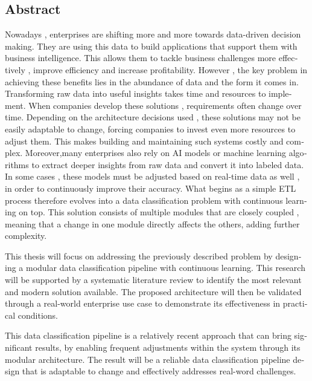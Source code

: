 

\begin{otherlanguage}{american}
	\chapter*{Abstract}
	Nowadays , enterprises are shifting more and more towards data-driven decision making. They are using this data to build applications that support them with business intelligence. This allows them to tackle business challenges more effectively , improve efficiency and increase profitability. However , the key problem in achieving these benefits lies in the abundance of data and the form it comes in. Transforming raw data into useful insights takes time and resources to implement. When companies develop these solutions , requirements often change over time. Depending on the architecture decisions used , these solutions may not be easily adaptable to change, forcing companies to invest even more resources to adjust them. This makes building and maintaining such systems costly and complex. Moreover,many enterprises also rely on AI models or machine learning algorithms to extract deeper insights from raw data and convert it into labeled data. In some cases , these models must be adjusted based on real-time data as well , in order to continuously improve their accuracy. What begins as a simple ETL process therefore evolves into a data classification problem with continuous learning on top. This solution consists of multiple modules that are closely coupled , meaning that a change in one module directly affects the others, adding further complexity.
	\smallskip

	This thesis will focus on addressing the previously described problem by designing a modular data classification pipeline with continuous learning. This research will be supported by a systematic literature review to identify the most relevant and modern solution available. The proposed architecture will then be validated through a real-world enterprise use case to demonstrate its effectiveness in practical conditions.
	\smallskip

	This data classification pipeline is a relatively recent approach that can bring significant results, by enabling frequent adjustments within the system through its modular architecture. The result will be a reliable data classification pipeline design that is adaptable to change and effectively addresses real-word challenges.

\end{otherlanguage}
